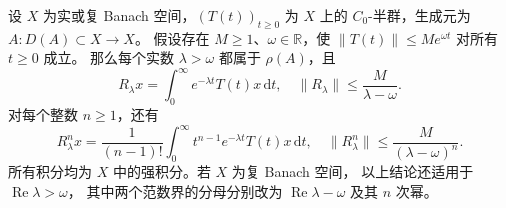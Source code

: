 \begin{proposition}\label{b2:prop:D-laplace-resolvent}
设 \(X\) 为实或复 Banach 空间，\((T(t))_{t\ge0}\) 为 \(X\) 上的
\(C_0\)-半群，生成元为 \(A:D(A)\subset X\to X\)。
假设存在 \(M\ge1\)、\(\omega\in\mathbb R\)，使
\(\|T(t)\|\le Me^{\omega t}\) 对所有 \(t\ge0\) 成立。
那么每个实数 \(\lambda>\omega\) 都属于 \(\rho(A)\)，且
\[
 R_\lambda x=\int_0^\infty e^{-\lambda t}T(t)x\,\mathrm dt,
 \quad
 \|R_\lambda\|\le\frac{M}{\lambda-\omega}.
\]
对每个整数 \(n\ge1\)，还有
\[
 R_\lambda^n x=
 \frac1{(n-1)!}\int_0^\infty
       t^{n-1}e^{-\lambda t}T(t)x\,\mathrm dt,
 \quad
 \|R_\lambda^n\|\le\frac{M}{(\lambda-\omega)^n}.
\]
所有积分均为 \(X\) 中的强积分。若 \(X\) 为复 Banach 空间，
以上结论还适用于 \(\operatorname{Re}\lambda>\omega\)，
其中两个范数界的分母分别改为
\(\operatorname{Re}\lambda-\omega\) 及其 \(n\) 次幂。
\end{proposition}
